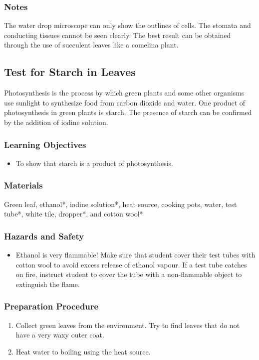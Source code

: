 \subsubsection*{Notes}
The water drop microscope can only show the outlines of cells. The stomata and conducting tissues cannot be seen clearly. The best result can be obtained through the use of succulent leaves like a comelina plant.

\subsection{Test for Starch in Leaves}
Photosynthesis is the process by which green plants and some other organisms use sunlight to synthesize food from carbon dioxide and water. One product of photosynthesis in green plants is starch. The presence of starch can be confirmed by the addition of iodine solution.

\subsubsection*{Learning Objectives}
\begin{itemize}
\item{To show that starch is a product of photosynthesis.}
\end{itemize}

\subsubsection*{Materials}
Green leaf, ethanol*, iodine solution*, heat source, cooking pots, water, test tube*, white tile, dropper*, and cotton wool*

\subsubsection*{Hazards and Safety}
\begin{itemize}
\item{Ethanol is very flammable! Make sure that student cover their test tubes with cotton wool to avoid excess release of ethanol vapour. If a test tube catches on fire, instruct student to cover the tube with a non-flammable object to extinguish the flame.}
\end{itemize}


\subsubsection*{Preparation Procedure}
\begin{enumerate}
\item{Collect green leaves from the environment. Try to find leaves that do not have a very waxy outer coat.}
\item{Heat water to boiling using the heat source.}
\end{enumerate}

